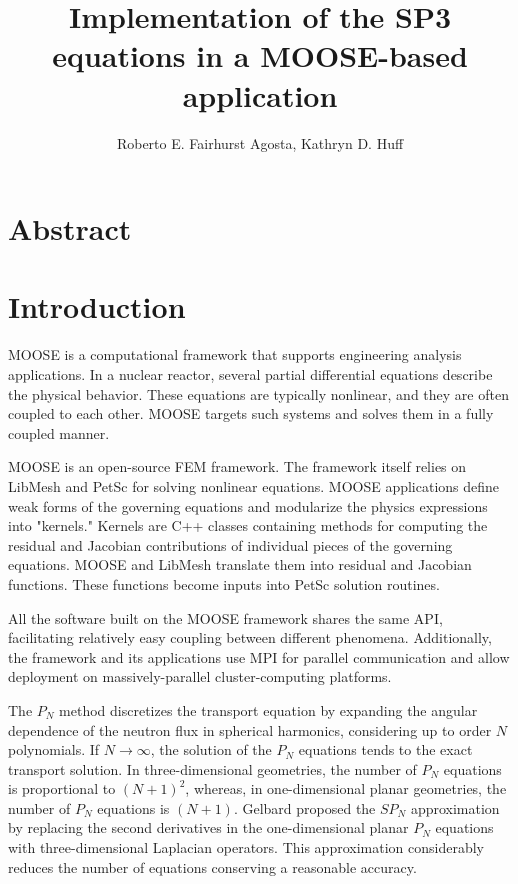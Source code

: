 \documentclass{anstrans}
\title{Implementation of the SP3 equations in a MOOSE-based application}
\author{Roberto E. Fairhurst Agosta, Kathryn D. Huff}
\institute{
University of Illinois at Urbana-Champaign, Dept. of Nuclear, Plasma, and Radiological Engineering\\
ref3@illinois.edu
}
\begin{document}

\section{Abstract}



\section{Introduction}



MOOSE\cite{gaston_moose_2009} is a computational framework that supports engineering analysis applications.
In a nuclear reactor, several partial differential equations describe the physical behavior.
These equations are typically nonlinear, and they are often coupled to each other.
MOOSE targets such systems and solves them in a fully coupled manner.

MOOSE is an open-source \gls{FEM} framework.
The framework itself relies on LibMesh\cite{kirk_libmesh_2006} and PetSc\cite{balay_petsc_2016} for solving nonlinear equations.
MOOSE applications define weak forms of the governing equations and modularize the physics expressions into "kernels."
Kernels are C++ classes containing methods for computing the residual and Jacobian contributions of individual pieces of the governing equations.
MOOSE and LibMesh translate them into residual and Jacobian functions.
These functions become inputs into PetSc solution routines.

All the software built on the MOOSE framework shares the same \gls{API}, facilitating relatively easy coupling between different phenomena.
Additionally, the framework and its applications use \gls{MPI} for parallel communication and allow deployment on massively-parallel cluster-computing platforms.



The $P_N$ method \cite{davidson_neutron_1957} discretizes the transport equation by expanding the angular dependence of the neutron flux in spherical harmonics, considering up to order $N$ polynomials.
If $N \rightarrow \infty$, the solution of the $P_N$ equations tends to the exact transport solution.
In three-dimensional geometries, the number of $P_N$ equations is proportional to $(N+1)^2$, whereas, in one-dimensional planar geometries, the number of $P_N$ equations is $(N+1)$.
Gelbard \cite{gelbard_spherical_1960} proposed the $SP_N$ approximation by replacing the second derivatives in the one-dimensional planar $P_N$ equations with three-dimensional Laplacian operators.
This approximation considerably reduces the number of equations conserving a reasonable accuracy.
\end{document}
